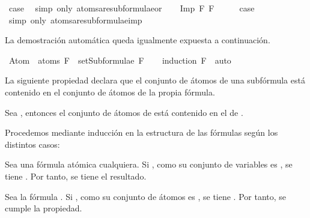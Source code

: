 \begin{isabellebody}
\ {\isacharquery}case\ \isamarkupfalse%
\ {\isacharparenleft}simp\ only{\isacharcolon}\ atoms{\isacharunderscore}are{\isacharunderscore}subformulae{\isacharunderscore}or{\isacharparenright}\isanewline
{}\isamarkupfalse%
\isanewline
\ \ \isamarkupfalse%
\ {\isacharparenleft}Imp\ F{}\ F{}{\isacharparenright}\isanewline
\ \ \isamarkupfalse%
\ \isamarkupfalse%
\ {\isacharquery}case\ \isamarkupfalse%
\ {\isacharparenleft}simp\ only{\isacharcolon}\ atoms{\isacharunderscore}are{\isacharunderscore}subformulae{\isacharunderscore}imp{\isacharparenright}\isanewline
{}\isamarkupfalse%
%
\endisatagproof
{\isafoldproof}%
%
\isadelimproof
%
\endisadelimproof
%
\begin{isamarkuptext}%
La demostración automática queda igualmente expuesta a 
  continuación.%
\end{isamarkuptext}\isamarkuptrue%
\isamarkupfalse%
\ {\isachardoublequoteopen}Atom\ {\isacharbackquote}\ atoms\ F\ {\isasymsubseteq}\ setSubformulae\ F{\isachardoublequoteclose}\isanewline
%
\isadelimproof
\ \ %
\endisadelimproof
%
\isatagproof
{}\isamarkupfalse%
\ {\isacharparenleft}induction\ F{\isacharparenright}\ \ auto%
\endisatagproof
{\isafoldproof}%
%
\isadelimproof
%
\endisadelimproof
%
\begin{isamarkuptext}%
La siguiente propiedad declara que el conjunto de átomos de una 
  subfórmula está contenido en el conjunto de átomos de la propia 
  fórmula.
  \begin{lema}
    Sea , entonces el conjunto de átomos de  está
    contenido en el de .
  \end{lema}

  \begin{demostracion}
  Procedemos mediante inducción en la estructura de las fórmulas según 
  los distintos casos:

  Sea  una fórmula atómica cualquiera. Si , 
  como su conjunto de variables es , se tiene . 
  Por tanto, se tiene el resultado.

  Sea la fórmula \isa{{\isasymbottom}}. Si , como  su conjunto de átomos es
  \isa{{\isacharbraceleft}{\isasymbottom}{\isacharbraceright}}, se tiene . Por tanto, se cumple la propiedad.


\end{demostracion}
\end{isamarkuptext}
\end{isabellebody}
